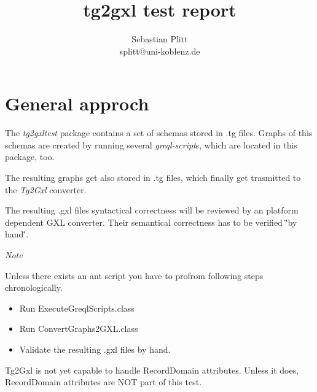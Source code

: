 \documentclass[a4paper,twoside,10pt]{article}
\title{tg2gxl test report}
\author{Sebastian Plitt \\ splitt@uni-koblenz.de}
\begin{document}
\sloppy
{}
\maketitle
\nopagebreak
\clearpage
\tableofcontents
\clearpage
{}
\setcounter{page}{1}
\chapter{General approch}The \emph{tg2gxltest} package contains a set of schemas stored in .tg files. Graphs of this schemas are created by running several \emph{greql-script}s, which are located in this package, too.

The resulting graphs get also stored in .tg files, which finally get trasmitted to the \emph{Tg2Gxl} converter.

The resulting .gxl files syntactical correctness will be reviewed by an platform dependent GXL converter.
Their semantical correctness has to be verified \"'by hand\"'.
 
\emph{Note}

Unless there exists an ant script you have to profrom following steps chronologically.
\begin{itemize}
\item Run ExecuteGreqlScripts.class
\item Run ConvertGraphs2GXL.class
\item Validate the resulting .gxl files by hand.
\end{itemize}
Tg2Gxl is not yet capable to handle RecordDomain attributes. Unless it does, RecordDomain attributes are NOT part of this test.
\end{document}
